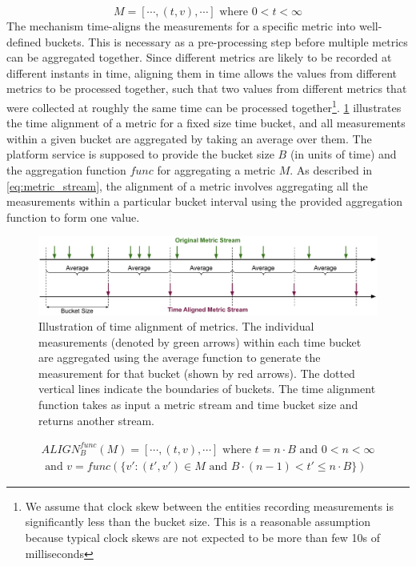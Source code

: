 \begin{itemize}
\begin{equation}
M = \left[ \cdots , \left( t, v \right) , \cdots \right] \text{ where } 0 < t < \infty
\label{eq:metric_stream}
\end{equation}
The mechanism time-aligns the measurements for a specific metric into well-defined buckets. This is necessary as a pre-processing step before multiple metrics can be aggregated together. Since different metrics are likely to be recorded at different instants in time, aligning them in time allows the values from different metrics to be processed together, such that two values from different metrics that were collected at roughly the same time can be processed together\footnote{We assume that clock skew between the entities recording measurements is significantly less than the bucket size. This is a reasonable assumption because typical clock skews are not expected to be more than few 10s of milliseconds}. \cref{fig:time_alignment} illustrates the time alignment of a metric for a fixed size time bucket, and all measurements within a given bucket are aggregated by taking an average over them. The platform service is supposed to provide the bucket size $B$ (in units of time) and the aggregation function $func$ for aggregating a metric $M$. As described in \cref{eq:metric_stream}, the alignment of a metric involves aggregating all the measurements within a particular bucket interval using the provided aggregation function to form one value.
\begin{figure}
\centering
\includegraphics[width=\linewidth]{figures/mechanisms/monitoring/time_alignment}
\caption{Illustration of time alignment of metrics. The individual measurements (denoted by green arrows) within each time bucket are aggregated using the average function to generate the measurement for that bucket (shown by red arrows). The dotted vertical lines indicate the boundaries of buckets. The time alignment function takes as input a metric stream and time bucket size and returns another stream.}
\label{fig:time_alignment}
\end{figure}
\begin{multline}
ALIGN^{func}_{B} \left( M \right) = \left[ \cdots , \left( t, v \right) , \cdots \right] \text{ where } t = n\cdot B \text{ and } 0 < n < \infty \\ \text{ and } v = func \left( \{ v' : \left( t', v'\right) \in M \text{ and } B\cdot \left( n-1\right) < t' \leq n \cdot B \} \right)
\label{eq:metric_stream}
\end{multline}


\end{itemize}
